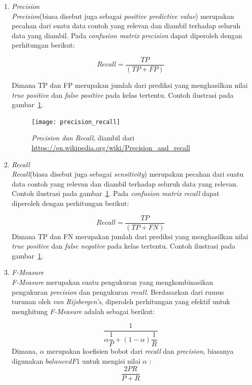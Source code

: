 \begin{enumerate}
	 \item \textit{Precision}\\
	 \textit{Precision}(biasa disebut juga sebagai \textit{positive predictive value}) merupakan pecahan dari suatu data contoh yang relevan dan diambil terhadap seluruh data yang diambil. Pada \textit{confusion matrix} \textit{precision} dapat diperoleh dengan perhitungan berikut:

	 \begin{equation}
	 	Recall = \dfrac{TP}{(TP + FP)}
	 \end{equation}
	 
	 Dimana TP dan FP merupakan jumlah dari prediksi yang menghasilkan nilai \textit{true positive} dan \textit{false positive} pada kelas tertentu. Contoh ilustrasi pada gambar~\ref{fig:precision_recall}. 
	 
	\begin{figure}[H]
	\centering
	\texttt{[image: precision\_recall]}
	\caption[\textit{Precision dan Recall}, diambil dari \url{https://en.wikipedia.org/wiki/Precision_and_recall}]{\textit{Precision dan Recall}, diambil dari \url{https://en.wikipedia.org/wiki/Precision_and_recall}}
	\label{fig:precision_recall}
\end{figure}

	 \item \textit{Recall}\\
	 \textit{Recall}(biasa disebut juga sebagai \textit{sensitivity}) merupakan pecahan dari suatu data contoh yang relevan dan diambil terhadap seluruh data yang relevan. Contoh ilustrasi pada gambar~\ref{fig:precision_recall}. Pada \textit{confusion matrix} \textit{recall} dapat diperoleh dengan perhitungan berikut:

	 \begin{equation}
	 	Recall = \dfrac{TP}{(TP + FN)}
	 \end{equation}
	Dimana TP dan FN merupakan jumlah dari prediksi yang menghasilkan nilai \textit{true positive} dan \textit{false negative} pada kelas tertentu. Contoh ilustrasi pada gambar~\ref{fig:precision_recall}. 	 
	 
	 \item \textit{F-Measure}\\
	  \textit{F-Measure} merupakan suatu pengukuran yang mengkombinasikan pengukuran \textit{precision} dan pengukuran \textit{recall}. Berdasarkan dari rumus turunan oleh \textit{van Rijsbergen's}, diperoleh perhitungan yang efektif untuk menghitung \textit{F-Measure} adalah sebagai berikut:
	 
	 \begin{equation}
	 	\dfrac{1}{\alpha \dfrac{1}{P} + (1 - \alpha)\dfrac{1}{R}}
	 \end{equation}
	 Dimana, $\alpha$ merupakan koefisien bobot dari \textit{recall} dan \textit{precision}, biasanya digunakan $balanced F1$ untuk mengisi nilai $\alpha$ :
	 \begin{equation}
	 	\dfrac{2PR}{P + R}
	 \end{equation}

\end{enumerate}


